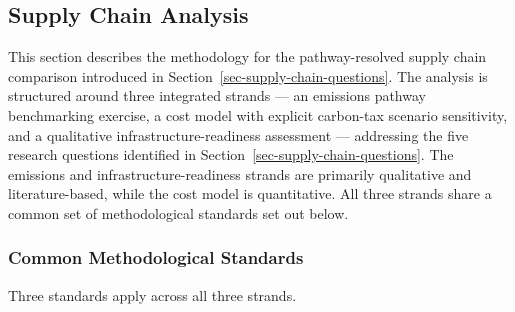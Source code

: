 \documentclass[12pt]{article}
\begin{document}
\break

\subsection{Supply Chain Analysis}
\label{subsec:supply-chain-methodology}

This section describes the methodology for the pathway-resolved supply chain 
comparison introduced in Section~\ref{sec-supply-chain-questions}. The analysis is 
structured around three integrated strands --- an emissions pathway benchmarking 
exercise, a cost model with explicit carbon-tax scenario sensitivity, and a 
qualitative infrastructure-readiness assessment --- addressing the five research 
questions identified in Section~\ref{sec-supply-chain-questions}. The emissions and 
infrastructure-readiness strands are primarily qualitative and literature-based, 
while the cost model is quantitative. All three strands share a common set of 
methodological standards set out below.

\subsubsection*{Common Methodological Standards}

Three standards apply across all three strands.
\end{document}
